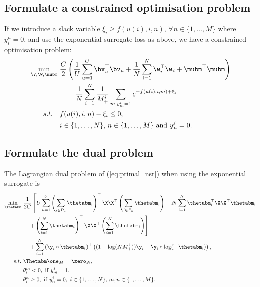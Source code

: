 \subsection{Formulate a constrained optimisation problem}
If we introduce a slack variable $\xi_i \ge f(u(i), i, n), \, \forall n \in \{1,\dots,M\}$ where $y_i^n = 0$,
and use the exponential surrogate loss as above, we have a constrained optimisation problem:
\begin{equation*}
\label{eq:primal_nsr}
\begin{aligned}
\min_{\V, \W, \mubm} \ &
\frac{C}{2} \left( \frac{1}{U} \sum_{u=1}^U \bv_u^\top \bv_u 
     + \frac{1}{N} \sum_{i=1}^N \w_i^\top \w_i + \mubm^\top \mubm \right) \\
& \hspace{1em}
     + \frac{1}{N} \sum_{i=1}^N \frac{1}{M_+^i} \sum_{m: y_m^i = 1} e^{-f(u(i), i, m) + \xi_i} \\
s.t. \quad & 
f(u(i), i, n) - \xi_i \le 0, \\
& i \in \{1,\dots,N\}, \, n \in \{1,\dots,M\} \ \mathrm{and} \ y_n^i = 0.
\end{aligned}
\end{equation*}


\subsection{Formulate the dual problem}
The Lagrangian dual problem of (\ref{eq:primal_nsr}) when using the exponential surrogate is
\begin{equation}
\label{eq:dual_nsr}
\begin{aligned}
\min_{\Thetabm} \ & \frac{1}{2 C} \left[
     U \sum_{u=1}^U \left( \sum_{i \in P_u} \thetabm_i \right)^\top \X \X^\top \left( \sum_{i \in P_u} \thetabm_i \right)
   + N \sum_{i=1}^N \thetabm_i^\top \X \X^\top \thetabm_i \right. \\
& \hspace{1em} \left.
   + \left( \sum_{i=1}^N \thetabm_i \right)^\top \X \X^\top \left( \sum_{i=1}^N \thetabm_i \right) \right] \\
& \hspace{1em}
   + \sum_{i=1}^N \left( \y_i \circ \thetabm_i \right)^\top \left( (1 - \log(N M_+^i)) \y_i - \y_i \circ \log(-\thetabm_i) \right), \\
s.t. \ 
& \Thetabm \one_M = \zero_N, \\
& \theta_i^m < 0, \ \mathrm{if} \ y_m^i = 1, \\
& \theta_i^n \ge 0, \ \mathrm{if} \ y_n^i = 0, \ i \in \{1,\dots,N\}, \, m,n \in \{1,\dots,M\}.
\end{aligned}
\end{equation}
